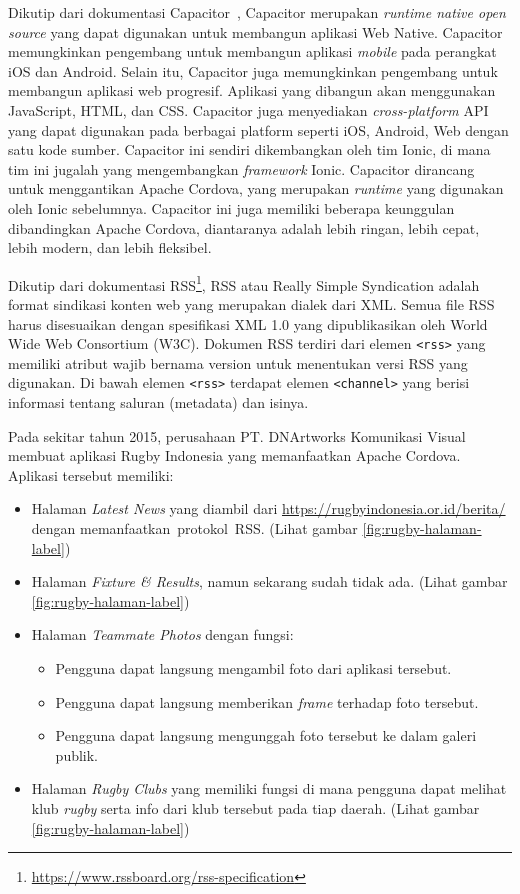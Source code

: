 Dikutip dari dokumentasi Capacitor~\cite{capacitor-docs}, Capacitor merupakan \textit{runtime native open source} yang dapat digunakan untuk membangun aplikasi Web Native. Capacitor memungkinkan pengembang untuk membangun aplikasi \textit{mobile} pada perangkat iOS dan Android. Selain itu, Capacitor juga memungkinkan pengembang untuk membangun aplikasi web progresif. Aplikasi yang dibangun akan menggunakan JavaScript, HTML, dan CSS. Capacitor juga menyediakan \textit{cross-platform} API yang dapat digunakan pada berbagai platform seperti iOS, Android, Web dengan satu kode sumber. Capacitor ini sendiri dikembangkan oleh tim Ionic, di mana tim ini jugalah yang mengembangkan \textit{framework} Ionic. Capacitor dirancang untuk menggantikan Apache Cordova, yang merupakan \textit{runtime} yang digunakan oleh Ionic sebelumnya. Capacitor ini juga memiliki beberapa keunggulan dibandingkan Apache Cordova, diantaranya adalah lebih ringan, lebih cepat, lebih modern, dan lebih fleksibel.

Dikutip dari dokumentasi RSS\footnote{\url{https://www.rssboard.org/rss-specification}}, RSS atau Really Simple Syndication adalah format sindikasi konten web yang merupakan dialek dari XML. Semua file RSS harus disesuaikan dengan spesifikasi XML 1.0 yang dipublikasikan oleh World Wide Web Consortium (W3C). Dokumen RSS terdiri dari elemen \texttt{<rss>} yang memiliki atribut wajib bernama version untuk menentukan versi RSS yang digunakan. Di bawah elemen \texttt{<rss>} terdapat elemen \texttt{<channel>} yang berisi informasi tentang saluran (metadata) dan isinya.

Pada sekitar tahun 2015, perusahaan PT. DNArtworks Komunikasi Visual membuat aplikasi Rugby Indonesia yang memanfaatkan Apache Cordova. Aplikasi tersebut memiliki: 
\begin{itemize}
    \item Halaman \textit{Latest News} yang diambil dari \url{https://rugbyindonesia.or.id/berita/} dengan memanfaatkan~protokol~RSS. {(Lihat gambar \ref{fig:rugby-halaman-label})}
    \item Halaman \textit{Fixture \& Results}, namun sekarang sudah tidak ada. {(Lihat gambar \ref{fig:rugby-halaman-label})}
    \item Halaman \textit{Teammate Photos} dengan fungsi:
    \begin{itemize}
        \item Pengguna dapat langsung mengambil foto dari aplikasi tersebut.
        \item Pengguna dapat langsung memberikan \textit{frame} terhadap foto tersebut.
        \item Pengguna dapat langsung mengunggah foto tersebut ke dalam galeri publik.
    \end{itemize}
    \item Halaman \textit{Rugby Clubs} yang memiliki fungsi di mana pengguna dapat melihat klub \textit{rugby} serta info dari klub tersebut pada tiap daerah. {(Lihat gambar \ref{fig:rugby-halaman-label})}
\end{itemize}

